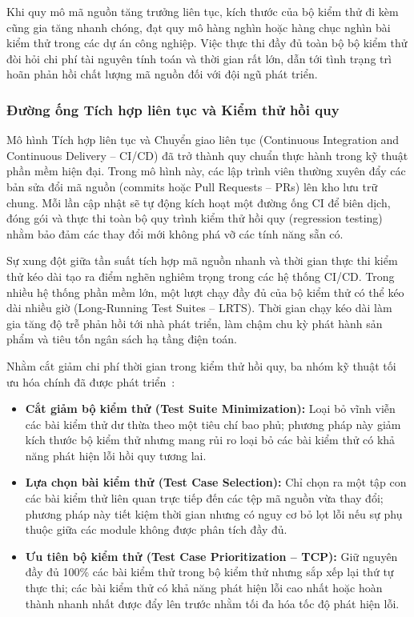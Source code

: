 Khi quy mô mã nguồn tăng trưởng liên tục, kích thước của bộ kiểm thử đi kèm cũng gia tăng nhanh chóng, đạt quy mô hàng nghìn hoặc hàng chục nghìn bài kiểm thử trong các dự án công nghiệp. Việc thực thi đầy đủ toàn bộ bộ kiểm thử đòi hỏi chi phí tài nguyên tính toán và thời gian rất lớn, dẫn tới tình trạng trì hoãn phản hồi chất lượng mã nguồn đối với đội ngũ phát triển.

\subsubsection{Đường ống Tích hợp liên tục và Kiểm thử hồi quy}
\label{subsubsec:ci_cd_regression}

Mô hình Tích hợp liên tục và Chuyển giao liên tục (Continuous Integration and Continuous Delivery -- CI/CD) đã trở thành quy chuẩn thực hành trong kỹ thuật phần mềm hiện đại. Trong mô hình này, các lập trình viên thường xuyên đẩy các bản sửa đổi mã nguồn (commits hoặc Pull Requests -- PRs) lên kho lưu trữ chung. Mỗi lần cập nhật sẽ tự động kích hoạt một đường ống CI để biên dịch, đóng gói và thực thi toàn bộ quy trình kiểm thử hồi quy (regression testing) nhằm bảo đảm các thay đổi mới không phá vỡ các tính năng sẵn có.

Sự xung đột giữa tần suất tích hợp mã nguồn nhanh và thời gian thực thi kiểm thử kéo dài tạo ra điểm nghẽn nghiêm trọng trong các hệ thống CI/CD. Trong nhiều hệ thống phần mềm lớn, một lượt chạy đầy đủ của bộ kiểm thử có thể kéo dài nhiều giờ (Long-Running Test Suites -- LRTS). Thời gian chạy kéo dài làm gia tăng độ trễ phản hồi tới nhà phát triển, làm chậm chu kỳ phát hành sản phẩm và tiêu tốn ngân sách hạ tầng điện toán.

Nhằm cắt giảm chi phí thời gian trong kiểm thử hồi quy, ba nhóm kỹ thuật tối ưu hóa chính đã được phát triển~\cite{yoo2012regression}:
\begin{itemize}
    \item \textbf{Cắt giảm bộ kiểm thử (Test Suite Minimization):} Loại bỏ vĩnh viễn các bài kiểm thử dư thừa theo một tiêu chí bao phủ; phương pháp này giảm kích thước bộ kiểm thử nhưng mang rủi ro loại bỏ các bài kiểm thử có khả năng phát hiện lỗi hồi quy tương lai.
    \item \textbf{Lựa chọn bài kiểm thử (Test Case Selection):} Chỉ chọn ra một tập con các bài kiểm thử liên quan trực tiếp đến các tệp mã nguồn vừa thay đổi; phương pháp này tiết kiệm thời gian nhưng có nguy cơ bỏ lọt lỗi nếu sự phụ thuộc giữa các module không được phân tích đầy đủ.
    \item \textbf{Ưu tiên bộ kiểm thử (Test Case Prioritization -- TCP):} Giữ nguyên đầy đủ 100\% các bài kiểm thử trong bộ kiểm thử nhưng sắp xếp lại thứ tự thực thi; các bài kiểm thử có khả năng phát hiện lỗi cao nhất hoặc hoàn thành nhanh nhất được đẩy lên trước nhằm tối đa hóa tốc độ phát hiện lỗi.
\end{itemize}

